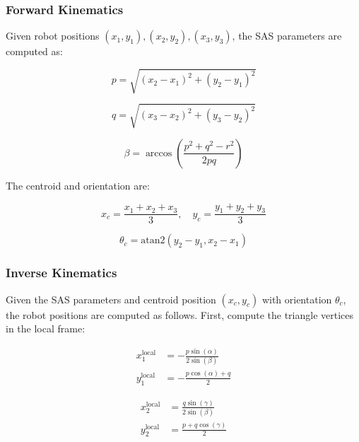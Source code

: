\documentclass[lettersize,journal]{IEEEtran}
\begin{document}
\subsubsection{Forward Kinematics}

Given robot positions $(x_1, y_1), (x_2, y_2), (x_3, y_3)$, the SAS parameters are computed as:

\begin{equation}
p = \sqrt{(x_2 - x_1)^2 + (y_2 - y_1)^2}
\end{equation}

\begin{equation}
q = \sqrt{(x_3 - x_2)^2 + (y_3 - y_2)^2}
\end{equation}


\begin{equation}
\beta = \arccos\left(\frac{p^2 + q^2 - r^2}{2pq}\right)
\end{equation}

The centroid and orientation are:

\begin{equation}
x_c = \frac{x_1 + x_2 + x_3}{3}, \quad y_c = \frac{y_1 + y_2 + y_3}{3}
\end{equation}

\begin{equation}
\theta_c = \text{atan2}(y_2 - y_1, x_2 - x_1)
\end{equation}

\subsubsection{Inverse Kinematics}

Given the SAS parameters and centroid position $(x_c, y_c)$ with orientation $\theta_c$, the robot positions are computed as follows. First, compute the triangle vertices in the local frame:

\begin{equation}
\begin{aligned}
x_1^{\text{local}} &= -\frac{p \sin(\alpha)}{2 \sin(\beta)} \\
y_1^{\text{local}} &= -\frac{p \cos(\alpha) + q}{2}
\end{aligned}
\end{equation}

\begin{equation}
\begin{aligned}
x_2^{\text{local}} &= \frac{q \sin(\gamma)}{2 \sin(\beta)} \\
y_2^{\text{local}} &= \frac{p + q \cos(\gamma)}{2}
\end{aligned}
\end{equation}
\end{document}
